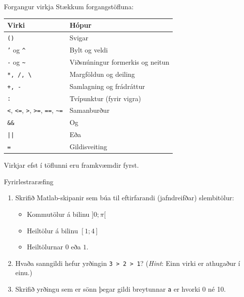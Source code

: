 \documentclass[handout]{beamer}
\begin{document}
\begin{frame}{Forgangur virkja}
\vspace{-0.5cm}
Stækkum forgangstöfluna:
\begin{center}
\small
\begin{tabular}{ll}
\toprule
Virki&Hópur\\
\midrule
\texttt{()}&Svigar\\
\texttt{'} og \texttt{\^}&Bylt og veldi\\
\texttt{-} og \texttt{\~{}}&Viðsnúningur formerkis og neitun\\
\texttt{*, /, \textbackslash}&Margföldun og deiling\\
\texttt{+, -}&Samlagning og frádráttur\\
\texttt{:}&Tvípunktur (fyrir vigra)\\
\texttt{<}, \texttt{<=}, \texttt{>}, \texttt{>=}, \texttt{==}, \texttt{\~{}=}&Samanburður\\
\texttt{\&\&}&Og\\
\texttt{||}&Eða\\
\texttt{=}&Gildisveiting\\
\bottomrule
\end{tabular}
\end{center}
Virkjar efst í töflunni eru framkvæmdir fyrst.
\end{frame}

\begin{frame}{Fyrirlestraræfing}
\begin{enumerate}
    \item Skrifið Matlab-skipanir sem búa til eftirfarandi (jafndreifðar) slembitölur:
    \begin{itemize}
        \item Kommutölur á bilinu $]0;\pi[$
        \item Heiltölur á bilinu $[1;4]$
        \item Heiltölurnar $0$ eða $1$.
    \end{itemize}
    \item Hvaða sanngildi hefur yrðingin \texttt{3 > 2 > 1}? (\emph{Hint}: Einn virki er athugaður í einu.)
    \item Skrifið yrðingu sem er sönn þegar gildi breytunnar \texttt{a} er hvorki 0 né 10.
\end{enumerate}
\end{frame}
\end{document}
